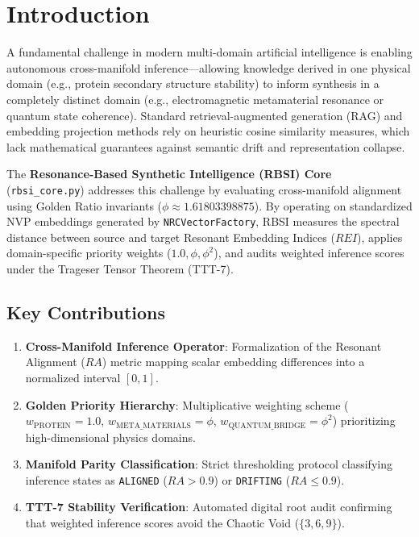 \section{Introduction}
A fundamental challenge in modern multi-domain artificial intelligence is enabling autonomous cross-manifold inference—allowing knowledge derived in one physical domain (e.g., protein secondary structure stability) to inform synthesis in a completely distinct domain (e.g., electromagnetic metamaterial resonance or quantum state coherence). Standard retrieval-augmented generation (RAG) and embedding projection methods rely on heuristic cosine similarity measures, which lack mathematical guarantees against semantic drift and representation collapse.

The \textbf{Resonance-Based Synthetic Intelligence (RBSI) Core} (\texttt{rbsi\_core.py}) addresses this challenge by evaluating cross-manifold alignment using Golden Ratio invariants ($\phi \approx 1.61803398875$). By operating on standardized NVP embeddings generated by \texttt{NRCVectorFactory}, RBSI measures the spectral distance between source and target Resonant Embedding Indices ($REI$), applies domain-specific priority weights ($1.0, \phi, \phi^2$), and audits weighted inference scores under the Trageser Tensor Theorem (TTT-7).

\subsection{Key Contributions}
\begin{enumerate}[label=\textbf{\arabic*.}]
    \item \textbf{Cross-Manifold Inference Operator}: Formalization of the Resonant Alignment ($RA$) metric mapping scalar embedding differences into a normalized interval $[0, 1]$.
    \item \textbf{Golden Priority Hierarchy}: Multiplicative weighting scheme ($w_{\text{PROTEIN}} = 1.0$, $w_{\text{META\_MATERIALS}} = \phi$, $w_{\text{QUANTUM\_BRIDGE}} = \phi^2$) prioritizing high-dimensional physics domains.
    \item \textbf{Manifold Parity Classification}: Strict thresholding protocol classifying inference states as \texttt{ALIGNED} ($RA > 0.9$) or \texttt{DRIFTING} ($RA \le 0.9$).
    \item \textbf{TTT-7 Stability Verification}: Automated digital root audit confirming that weighted inference scores avoid the Chaotic Void ($\{3, 6, 9\}$).
\end{enumerate}
